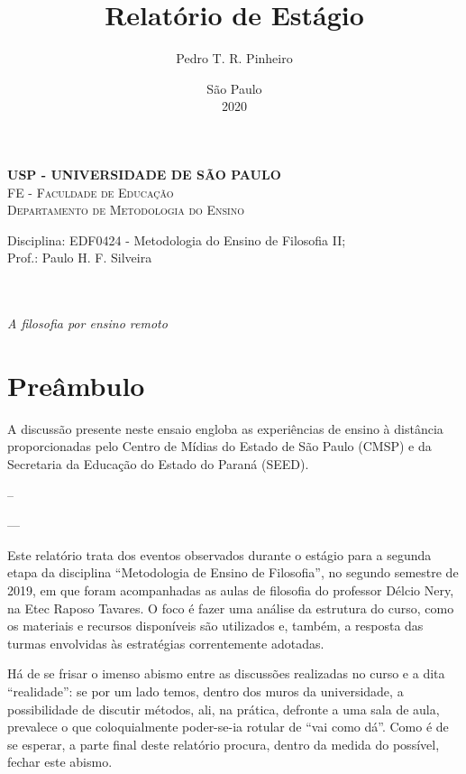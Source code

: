 \documentclass[12pt,a4paper]{article}
\author{Pedro T. R. Pinheiro}
\date{São Paulo\\2020}
\title{Relatório de Estágio}
\newcommand{\subtitulo}{A filosofia por ensino remoto}
\newcommand{\disciplina}{EDF0424 - Metodologia do Ensino de Filosofia II}
\newcommand{\departamento}{Departamento de Metodologia do Ensino}
\newcommand{\unidade}{FE - Faculdade de Educação}
\newcommand{\prof}{Paulo H. F. Silveira}
\begin{document}
	\begin{center}
				\textbf{
				\LARGE USP - UNIVERSIDADE DE SÃO PAULO \\
			}
			\Large \textsc{\unidade} \\
			\large \textsc{\departamento}\\
			\vspace*{1cm}
				
			Disciplina: \disciplina; \\Prof.: \prof
			\vfill
			\begin{center}
				{\Large \textsc{\theauthor}} \\ 
				\vspace{1cm}
				\LARGE\textbf{\thetitle} \\
				\Large\emph{\subtitulo}
			\end{center}
			\vfill
			\large\thedate
			\vspace*{1cm}
			\thispagestyle{empty}			
	\end{center}

	\newpage

	\setlength{\parskip}{0.5cm}
	\setlength{\parindent}{1.1cm}
	\onehalfspacing
	
	\section{Preâmbulo}
	
	A discussão presente neste ensaio engloba as experiências de ensino 
	à distância proporcionadas pelo Centro de Mídias do Estado de 
	São Paulo (CMSP) e da Secretaria da Educação do Estado do Paraná 
	(SEED).  



	--

	---

	Este relatório trata dos eventos observados durante o estágio para a segunda 
	etapa da disciplina ``Metodologia de Ensino de Filosofia'', no segundo 
	semestre de 2019, em que foram acompanhadas as aulas de filosofia do 
	professor Délcio Nery, na Etec Raposo Tavares. O foco é fazer uma análise 
	da estrutura do curso, como os materiais e recursos disponíveis são 
	utilizados e, também, a resposta das turmas envolvidas às estratégias 
	correntemente adotadas. 
	
	Há de se frisar o imenso abismo entre as discussões realizadas no curso 
	e a dita ``realidade'': se por um lado temos, dentro dos muros da 
	universidade, a possibilidade de discutir métodos, ali, na prática, 
	defronte a uma sala de aula, prevalece o que coloquialmente poder-se-ia 
	rotular de ``vai como dá''. Como é de se esperar, a parte final deste 
	relatório procura, dentro da medida do possível, fechar este abismo. 
	
\end{document}
